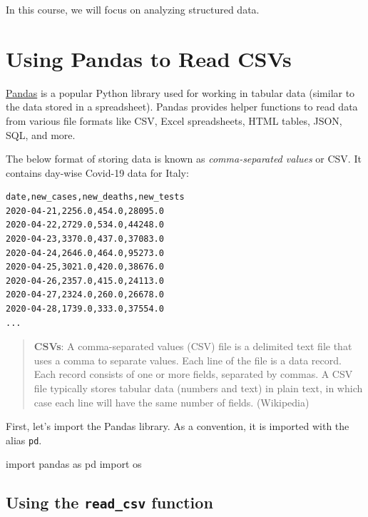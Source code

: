 \documentclass[
  letterpaper,
  DIV=11,
  numbers=noendperiod]{scrreprt}
\newenvironment{Shaded}{\begin{snugshade}}{\end{snugshade}}
\newcommand{\ImportTok}[1]{\textcolor[rgb]{0.00,0.46,0.62}{#1}}
\newcommand{\NormalTok}[1]{\textcolor[rgb]{0.00,0.23,0.31}{#1}}
\begin{document}
In this course, we will focus on analyzing structured data.

\hypertarget{using-pandas-to-read-csvs}{%
\section{Using Pandas to Read CSVs}\label{using-pandas-to-read-csvs}}

\href{https://pandas.pydata.org/}{Pandas} is a popular Python library
used for working in tabular data (similar to the data stored in a
spreadsheet). Pandas provides helper functions to read data from various
file formats like CSV, Excel spreadsheets, HTML tables, JSON, SQL, and
more.

The below format of storing data is known as \emph{comma-separated
values} or CSV. It contains day-wise Covid-19 data for Italy:

\begin{verbatim}
date,new_cases,new_deaths,new_tests
2020-04-21,2256.0,454.0,28095.0
2020-04-22,2729.0,534.0,44248.0
2020-04-23,3370.0,437.0,37083.0
2020-04-24,2646.0,464.0,95273.0
2020-04-25,3021.0,420.0,38676.0
2020-04-26,2357.0,415.0,24113.0
2020-04-27,2324.0,260.0,26678.0
2020-04-28,1739.0,333.0,37554.0
...
\end{verbatim}

\begin{quote}
\textbf{CSVs}: A comma-separated values (CSV) file is a delimited text
file that uses a comma to separate values. Each line of the file is a
data record. Each record consists of one or more fields, separated by
commas. A CSV file typically stores tabular data (numbers and text) in
plain text, in which case each line will have the same number of fields.
(Wikipedia)
\end{quote}

First, let's import the Pandas library. As a convention, it is imported
with the alias \texttt{pd}.

\begin{Shaded}
\begin{Highlighting}[]
\ImportTok{import}\NormalTok{ pandas }\ImportTok{as}\NormalTok{ pd}
\ImportTok{import}\NormalTok{ os}
\end{Highlighting}
\end{Shaded}

\hypertarget{using-the-read_csv-function}{%
\subsection{\texorpdfstring{Using the \texttt{read\_csv}
function}{Using the read\_csv function}}\label{using-the-read_csv-function}}
\end{document}

